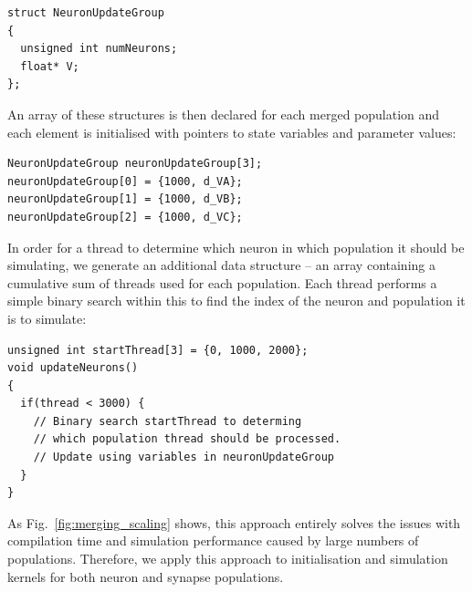 \documentclass[9pt,twocolumn,twoside,lineno]{pnas-new}
\begin{document}
\begin{lstlisting}
struct NeuronUpdateGroup
{
  unsigned int numNeurons;
  float* V;  
};

\end{lstlisting}
An array of these structures is then declared for each merged population and each element is initialised with pointers to state variables and parameter values:

\begin{lstlisting}
NeuronUpdateGroup neuronUpdateGroup[3];
neuronUpdateGroup[0] = {1000, d_VA};
neuronUpdateGroup[1] = {1000, d_VB};
neuronUpdateGroup[2] = {1000, d_VC};
\end{lstlisting}
In order for a thread to determine which neuron in which population it should be simulating, we generate an additional data structure -- an array containing a cumulative sum of threads used for each population.
Each thread performs a simple binary search within this to find the index of the neuron and population it is to simulate:

\begin{lstlisting}
unsigned int startThread[3] = {0, 1000, 2000};
void updateNeurons()
{
  if(thread < 3000) {
    // Binary search startThread to determing
    // which population thread should be processed.
    // Update using variables in neuronUpdateGroup
  }
}
\end{lstlisting}
As Fig.~\ref{fig:merging_scaling} shows, this approach entirely solves the issues with compilation time and simulation performance caused by large numbers of populations.
Therefore, we apply this approach to initialisation and simulation kernels for both neuron and synapse populations.
\end{document}
